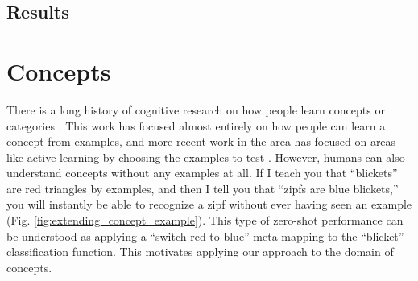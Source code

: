 \subsection{Results}


\section{Concepts}

There is a long history of cognitive research on how people learn concepts or categories \citep{Bourne1970, Medin1978, Kruschke1992, Goodman2008}. This work has focused almost entirely on how people can learn a concept from examples, and more recent work in the area has focused on areas like active learning by choosing the examples to test \citep{Markant2014, Markant2015}. However, humans can also understand concepts without any examples at all. If I teach you that ``blickets'' are red triangles by examples, and then I tell you that ``zipfs are blue blickets,'' you will instantly be able to recognize a zipf without ever having seen an example (Fig. \ref{fig:extending_concept_example}). This type of zero-shot performance can be understood as applying a ``switch-red-to-blue'' meta-mapping to the ``blicket'' classification function. This motivates applying our approach to the domain of concepts. \par 

